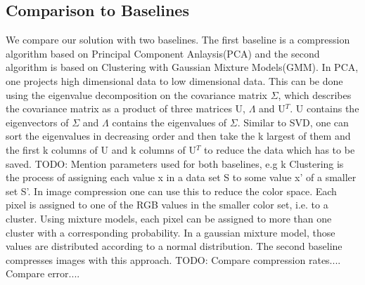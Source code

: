 \subsection{Comparison to Baselines}
We compare our solution with two baselines. The first baseline is a compression algorithm based on Principal Component Anlaysis(PCA) and the second algorithm is based on Clustering with Gaussian Mixture Models(GMM).  
\newline
In PCA, one projects high dimensional data to low dimensional data. This can be done using the eigenvalue decomposition on the covariance matrix $\Sigma$, which describes the covariance matrix as a product of three matrices U, $\Lambda$ and U$^T$. U contains the eigenvectors of  $\Sigma$ and $\Lambda$ contains the eigenvalues of $\Sigma$. Similar to SVD, one can sort the eigenvalues in decreasing order and then take the k largest of them and the first k columns of U and k columns of U$^T$ to reduce the data which has to be saved. 
\newline
\newline
TODO: Mention parameters used for both baselines, e.g k
\newline
\newline
Clustering is the process of assigning each value x in a data set S to some value x' of a smaller set S'. In image compression one can use this to reduce the color space. Each pixel is assigned to one of the RGB values in the smaller color set, i.e. to a cluster. Using mixture models, each pixel can be assigned to more than one cluster with a corresponding probability. In a gaussian mixture model, those values are distributed according to a normal distribution. The second baseline compresses images with this approach. 
\newline
TODO:
\newline
Compare compression rates.... 
\newline
Compare error....

